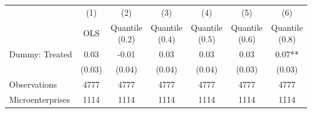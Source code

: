 {
\def\sym#1{\ifmmode^{#1}\else\(^{#1}\)\fi}
\begin{tabular}{l*{6}{c}}
\toprule
                    &\multicolumn{1}{c}{(1)}   &\multicolumn{1}{c}{(2)}   &\multicolumn{1}{c}{(3)}   &\multicolumn{1}{c}{(4)}   &\multicolumn{1}{c}{(5)}   &\multicolumn{1}{c}{(6)}   \\
                    &\specialcell{OLS\\\vphantom{()}}   &\specialcell{Quantile\\(0.2)}   &\specialcell{Quantile\\(0.4)}   &\specialcell{Quantile\\(0.5)}   &\specialcell{Quantile\\(0.6)}   &\specialcell{Quantile\\(0.8)}   \\
\midrule
Dummy: Treated      &        0.03   &       -0.01   &        0.03   &        0.03   &        0.03   &        0.07** \\
                    &      (0.03)   &      (0.04)   &      (0.04)   &      (0.04)   &      (0.03)   &      (0.03)   \\
\midrule
Observations        &        4777   &        4777   &        4777   &        4777   &        4777   &        4777   \\
Microenterprises    &        1114   &        1114   &        1114   &        1114   &        1114   &        1114   \\
\bottomrule
\end{tabular}
}
